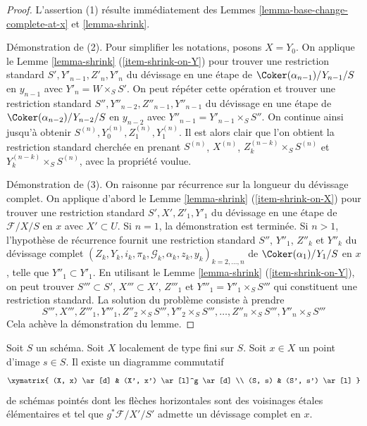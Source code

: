 \begin{proof}
L'assertion (1) résulte immédiatement des
Lemmes \ref{lemma-base-change-complete-at-x} et
\ref{lemma-shrink}.

\medskip\noindent
Démonstration de (2). Pour simplifier les notations, posons $X = Y_0$. On applique
le Lemme \ref{lemma-shrink} (\ref{item-shrink-on-Y})
pour trouver une restriction standard
$S', Y'_{n - 1}, Z'_n, Y'_n$
du d\'evissage en une étape de $\Coker(\alpha_{n - 1})/Y_{n - 1}/S$
en $y_{n - 1}$ avec $Y'_n = W \times_S S'$. On peut répéter cette opération
et trouver une restriction standard
$S'', Y''_{n - 2}, Z''_{n - 1}, Y''_{n - 1}$
du d\'evissage en une étape de $\Coker(\alpha_{n - 2})/Y_{n - 2}/S$
en $y_{n - 2}$ avec $Y''_{n - 1} = Y'_{n - 1} \times_S S''$.
On continue ainsi jusqu'à obtenir
$S^{(n)}, Y^{(n)}_0, Z^{(n)}_1, Y^{(n)}_1$.
Il est alors clair que l'on obtient la restriction standard cherchée
en prenant $S^{(n)}$, $X^{(n)}$, $Z_k^{(n - k)} \times_S S^{(n)}$ et
$Y_k^{(n - k)} \times_S S^{(n)}$, avec la propriété voulue.

\medskip\noindent
Démonstration de (3). On raisonne par récurrence sur la longueur du
d\'evissage complet. On applique d'abord
le Lemme \ref{lemma-shrink} (\ref{item-shrink-on-X})
pour trouver une restriction standard
$S', X', Z'_1, Y'_1$
du d\'evissage en une étape de $\mathcal{F}/X/S$ en $x$
avec $X' \subset U$. Si $n = 1$, la démonstration est terminée.
Si $n > 1$, l'hypothèse de récurrence fournit une restriction standard
$S''$, $Y''_1$, $Z''_k$ et $Y''_k$ du d\'evissage complet
$(Z_k, Y_k, i_k, \pi_k, \mathcal{G}_k, \alpha_k, z_k, y_k)_{k = 2, \ldots, n}$
de $\Coker(\alpha_1)/Y_1/S$ en $x$, telle que
$Y''_1 \subset Y'_1$. En utilisant
le Lemme \ref{lemma-shrink} (\ref{item-shrink-on-Y}),
on peut trouver $S''' \subset S'$, $X''' \subset X'$, $Z'''_1$ et
$Y'''_1 = Y''_1 \times_S S'''$ qui constituent une restriction standard.
La solution du problème consiste à prendre
$$
S''', X''', Z'''_1, Y'''_1, Z''_2 \times_S S''',
Y''_2 \times_S S''', \ldots, Z''_n \times_S S''', Y''_n \times_S S'''
$$
Cela achève la démonstration du lemme.
\end{proof}

\begin{proposition}
\label{proposition-existence-complete-at-x}
Soit $S$ un schéma.
Soit $X$ localement de type fini sur $S$.
Soit $x \in X$ un point d'image $s \in S$.
Il existe un diagramme commutatif
$$
\xymatrix{
(X, x) \ar[d] & (X', x') \ar[l]^g \ar[d] \\
(S, s) & (S', s') \ar[l]
}
$$
de schémas pointés dont les flèches
horizontales sont des voisinages \'etales élémentaires
et tel que $g^*\mathcal{F}/X'/S'$ admette un
d\'evissage complet en $x$.
\end{proposition}

